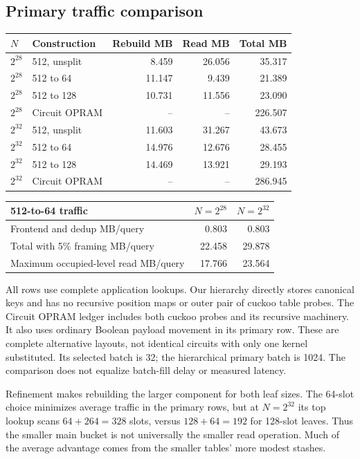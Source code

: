 \documentclass[11pt]{article}
\begin{document}
\subsection{Primary traffic comparison}
\begin{center}\small
\begin{tabular}{llrrr}\toprule
$N$ & Construction & Rebuild MB & Read MB & Total MB\\\midrule
$2^{28}$ & 512, unsplit & 8.459 & 26.056 & 35.317\\
$2^{28}$ & 512 to 64 & 11.147 & 9.439 & 21.389\\
$2^{28}$ & 512 to 128 & 10.731 & 11.556 & 23.090\\
$2^{28}$ & Circuit OPRAM & -- & -- & 226.507\\
$2^{32}$ & 512, unsplit & 11.603 & 31.267 & 43.673\\
$2^{32}$ & 512 to 64 & 14.976 & 12.676 & 28.455\\
$2^{32}$ & 512 to 128 & 14.469 & 13.921 & 29.193\\
$2^{32}$ & Circuit OPRAM & -- & -- & 286.945\\
\bottomrule\end{tabular}\end{center}
\begin{center}\small
\begin{tabular}{lrr}\toprule
512-to-64 traffic & $N=2^{28}$ & $N=2^{32}$\\\midrule
Frontend and dedup MB/query & 0.803 & 0.803\\
Total with 5\% framing MB/query & 22.458 & 29.878\\
Maximum occupied-level read MB/query & 17.766 & 23.564\\
\bottomrule\end{tabular}\end{center}
All rows use complete application lookups. Our hierarchy directly stores
canonical keys and has no recursive position maps or outer pair of cuckoo
table probes. The Circuit OPRAM ledger includes both cuckoo probes and its
recursive machinery. It also uses ordinary Boolean payload movement in
its primary row. These are complete alternative layouts, not identical
circuits with only one kernel substituted. Its selected batch is 32;
the hierarchical primary batch is 1024. The comparison does not equalize
batch-fill delay or measured latency.

Refinement makes rebuilding the larger component for both leaf sizes.
The 64-slot choice minimizes average traffic in the primary rows, but at
$N=2^{32}$ its top lookup scans $64+264=328$ slots, versus $128+64=192$
for 128-slot leaves. Thus the smaller main bucket is not universally the
smaller read operation. Much of the average advantage comes from the
smaller tables' more modest stashes.
\end{document}
